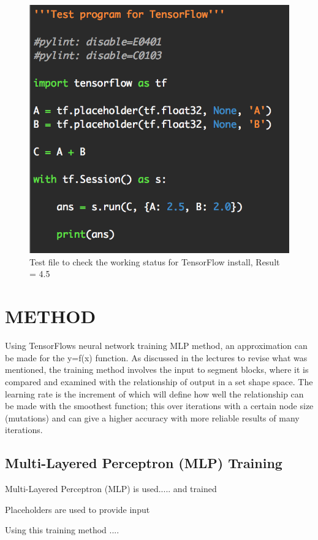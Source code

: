 \documentclass[a4paper, 10pt]{IEEEconf}
\begin{document}
\begin{figure}[H]
  \includegraphics[width=0.5\linewidth, center]{images/test}
  \caption{Test file to check the working status for TensorFlow install, Result = 4.5}
  \label{fig:Test file to check the working status for TensorFlow install, Result = 4.5}
\end{figure}

\section{METHOD}

Using TensorFlows neural network training MLP method, an approximation can be made for the y=f(x) function. As discussed in the lectures to revise what was mentioned, the training method involves the input to segment blocks, where it is compared and examined with the relationship of output in a set shape space. The learning rate is the increment of which will define how well the relationship can be made with the smoothest function; this over iterations with a certain node size (mutations) and can give a higher accuracy with more reliable results of many iterations. 


\subsection{Multi-Layered Perceptron (MLP) Training}

Multi-Layered Perceptron (MLP) is used..... and trained

Placeholders are used to provide input


Using this training method ....
\end{document}
